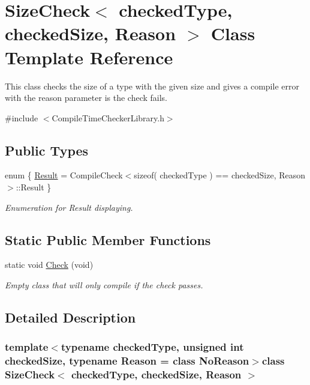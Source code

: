 \hypertarget{class_size_check}{\section{Size\-Check$<$ checked\-Type, checked\-Size, Reason $>$ Class Template Reference}
\label{class_size_check}
}


This class checks the size of a type with the given size and gives a compile error with the reason parameter is the check fails.  




{\ttfamily \#include $<$Compile\-Time\-Checker\-Library.\-h$>$}

\subsection*{Public Types}
\begin{DoxyCompactItemize}
\item 
enum \{ \hyperlink{class_size_check_a63104e95e61670b9f2b89af60512c866a8eec13abbe1b0ca10baf99b76909c77f}{Result} = Compile\-Check$<$sizeof( checked\-Type ) == checked\-Size, Reason$>$\-:\-:Result
 \}
\begin{DoxyCompactList}\small\item\em Enumeration for Result displaying. \end{DoxyCompactList}\end{DoxyCompactItemize}
\subsection*{Static Public Member Functions}
\begin{DoxyCompactItemize}
\item 
static void \hyperlink{class_size_check_a5e3ffed91b912bc4b3f8b3290dc64351}{Check} (void)
\begin{DoxyCompactList}\small\item\em Empty class that will only compile if the check passes. \end{DoxyCompactList}\end{DoxyCompactItemize}


\subsection{Detailed Description}
\subsubsection*{template$<$typename checked\-Type, unsigned int checked\-Size, typename Reason = class No\-Reason$>$class Size\-Check$<$ checked\-Type, checked\-Size, Reason $>$}

